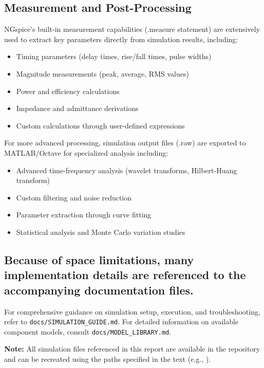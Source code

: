 \subsection{Measurement and Post-Processing}
NGspice's built-in measurement capabilities (.measure statement) are extensively used to extract key parameters directly from simulation results, including:
\begin{itemize}
    \item Timing parameters (delay times, rise/fall times, pulse widths)
    \item Magnitude measurements (peak, average, RMS values)
    \item Power and efficiency calculations
    \item Impedance and admittance derivations
    \item Custom calculations through user-defined expressions
\end{itemize}

For more advanced processing, simulation output files (.raw) are exported to MATLAB/Octave for specialized analysis including:
\begin{itemize}
    \item Advanced time-frequency analysis (wavelet transforms, Hilbert-Huang transform)
    \item Custom filtering and noise reduction
    \item Parameter extraction through curve fitting
    \item Statistical analysis and Monte Carlo variation studies
\end{itemize}

\subsection{Because of space limitations, many implementation details are referenced to the accompanying documentation files.}
For comprehensive guidance on simulation setup, execution, and troubleshooting, refer to \texttt{docs/SIMULATION\_GUIDE.md}. For detailed information on available component models, consult \texttt{docs/MODEL\_LIBRARY.md}.

\textbf{Note:} All simulation files referenced in this report are available in the repository and can be recreated using the paths specified in the text (e.g., ).